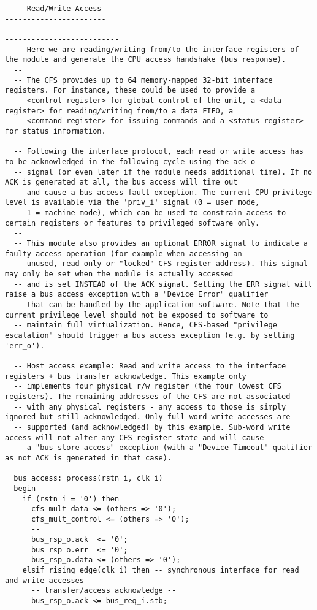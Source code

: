 \begin{code}
\begin{verbatim}
  -- Read/Write Access ----------------------------------------------------------------------
  -- -------------------------------------------------------------------------------------------
  -- Here we are reading/writing from/to the interface registers of the module and generate the CPU access handshake (bus response).
  --
  -- The CFS provides up to 64 memory-mapped 32-bit interface registers. For instance, these could be used to provide a
  -- <control register> for global control of the unit, a <data register> for reading/writing from/to a data FIFO, a
  -- <command register> for issuing commands and a <status register> for status information.
  --
  -- Following the interface protocol, each read or write access has to be acknowledged in the following cycle using the ack_o
  -- signal (or even later if the module needs additional time). If no ACK is generated at all, the bus access will time out
  -- and cause a bus access fault exception. The current CPU privilege level is available via the 'priv_i' signal (0 = user mode,
  -- 1 = machine mode), which can be used to constrain access to certain registers or features to privileged software only.
  --
  -- This module also provides an optional ERROR signal to indicate a faulty access operation (for example when accessing an
  -- unused, read-only or "locked" CFS register address). This signal may only be set when the module is actually accessed
  -- and is set INSTEAD of the ACK signal. Setting the ERR signal will raise a bus access exception with a "Device Error" qualifier
  -- that can be handled by the application software. Note that the current privilege level should not be exposed to software to
  -- maintain full virtualization. Hence, CFS-based "privilege escalation" should trigger a bus access exception (e.g. by setting 'err_o').
  --
  -- Host access example: Read and write access to the interface registers + bus transfer acknowledge. This example only
  -- implements four physical r/w register (the four lowest CFS registers). The remaining addresses of the CFS are not associated
  -- with any physical registers - any access to those is simply ignored but still acknowledged. Only full-word write accesses are
  -- supported (and acknowledged) by this example. Sub-word write access will not alter any CFS register state and will cause
  -- a "bus store access" exception (with a "Device Timeout" qualifier as not ACK is generated in that case).

  bus_access: process(rstn_i, clk_i)
  begin
    if (rstn_i = '0') then
      cfs_mult_data <= (others => '0');
      cfs_mult_control <= (others => '0');
      --
      bus_rsp_o.ack  <= '0';
      bus_rsp_o.err  <= '0';
      bus_rsp_o.data <= (others => '0');
    elsif rising_edge(clk_i) then -- synchronous interface for read and write accesses
      -- transfer/access acknowledge --
      bus_rsp_o.ack <= bus_req_i.stb;


\end{verbatim}
\end{code}
